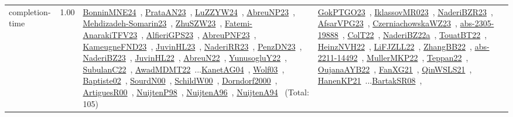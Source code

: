 {\begin{longtable}{p{3cm}r>{\raggedright\arraybackslash}p{6cm}>{\raggedright\arraybackslash}p{6cm}>{\raggedright\arraybackslash}p{8cm}}
\index{completion-time}\index{Concepts!completion-time}completion-time &  1.00 & \href{../works/BonninMNE24.pdf}{BonninMNE24}~\cite{BonninMNE24}, \href{../works/PrataAN23.pdf}{PrataAN23}~\cite{PrataAN23}, \href{../works/LuZZYW24.pdf}{LuZZYW24}~\cite{LuZZYW24}, \href{../works/AbreuNP23.pdf}{AbreuNP23}~\cite{AbreuNP23}, \href{../works/Mehdizadeh-Somarin23.pdf}{Mehdizadeh-Somarin23}~\cite{Mehdizadeh-Somarin23}, \href{../works/ZhuSZW23.pdf}{ZhuSZW23}~\cite{ZhuSZW23}, \href{../works/Fatemi-AnarakiTFV23.pdf}{Fatemi-AnarakiTFV23}~\cite{Fatemi-AnarakiTFV23}, \href{../works/AlfieriGPS23.pdf}{AlfieriGPS23}~\cite{AlfieriGPS23}, \href{../works/AbreuPNF23.pdf}{AbreuPNF23}~\cite{AbreuPNF23}, \href{../works/KameugneFND23.pdf}{KameugneFND23}~\cite{KameugneFND23}, \href{../works/JuvinHL23.pdf}{JuvinHL23}~\cite{JuvinHL23}, \href{../works/NaderiRR23.pdf}{NaderiRR23}~\cite{NaderiRR23}, \href{../works/PenzDN23.pdf}{PenzDN23}~\cite{PenzDN23}, \href{../works/NaderiBZ23.pdf}{NaderiBZ23}~\cite{NaderiBZ23}, \href{../works/JuvinHL22.pdf}{JuvinHL22}~\cite{JuvinHL22}, \href{../works/AbreuN22.pdf}{AbreuN22}~\cite{AbreuN22}, \href{../works/YunusogluY22.pdf}{YunusogluY22}~\cite{YunusogluY22}, \href{../works/SubulanC22.pdf}{SubulanC22}~\cite{SubulanC22}, \href{../works/AwadMDMT22.pdf}{AwadMDMT22}~\cite{AwadMDMT22}...\href{../works/KanetAG04.pdf}{KanetAG04}~\cite{KanetAG04}, \href{../works/Wolf03.pdf}{Wolf03}~\cite{Wolf03}, \href{../works/Baptiste02.pdf}{Baptiste02}~\cite{Baptiste02}, \href{../works/SourdN00.pdf}{SourdN00}~\cite{SourdN00}, \href{../works/SchildW00.pdf}{SchildW00}~\cite{SchildW00}, \href{../works/Dorndorf2000.pdf}{Dorndorf2000}~\cite{Dorndorf2000}, \href{../works/ArtiguesR00.pdf}{ArtiguesR00}~\cite{ArtiguesR00}, \href{../works/NuijtenP98.pdf}{NuijtenP98}~\cite{NuijtenP98}, \href{../works/NuijtenA96.pdf}{NuijtenA96}~\cite{NuijtenA96}, \href{../works/NuijtenA94.pdf}{NuijtenA94}~\cite{NuijtenA94} (Total: 105) & \href{../works/GokPTGO23.pdf}{GokPTGO23}~\cite{GokPTGO23}, \href{../works/IklassovMR023.pdf}{IklassovMR023}~\cite{IklassovMR023}, \href{../works/NaderiBZR23.pdf}{NaderiBZR23}~\cite{NaderiBZR23}, \href{../works/AfsarVPG23.pdf}{AfsarVPG23}~\cite{AfsarVPG23}, \href{../works/CzerniachowskaWZ23.pdf}{CzerniachowskaWZ23}~\cite{CzerniachowskaWZ23}, \href{../works/abs-2305-19888.pdf}{abs-2305-19888}~\cite{abs-2305-19888}, \href{../works/ColT22.pdf}{ColT22}~\cite{ColT22}, \href{../works/NaderiBZ22a.pdf}{NaderiBZ22a}~\cite{NaderiBZ22a}, \href{../works/TouatBT22.pdf}{TouatBT22}~\cite{TouatBT22}, \href{../works/HeinzNVH22.pdf}{HeinzNVH22}~\cite{HeinzNVH22}, \href{../works/LiFJZLL22.pdf}{LiFJZLL22}~\cite{LiFJZLL22}, \href{../works/ZhangBB22.pdf}{ZhangBB22}~\cite{ZhangBB22}, \href{../works/abs-2211-14492.pdf}{abs-2211-14492}~\cite{abs-2211-14492}, \href{../works/MullerMKP22.pdf}{MullerMKP22}~\cite{MullerMKP22}, \href{../works/Teppan22.pdf}{Teppan22}~\cite{Teppan22}, \href{../works/OujanaAYB22.pdf}{OujanaAYB22}~\cite{OujanaAYB22}, \href{../works/FanXG21.pdf}{FanXG21}~\cite{FanXG21}, \href{../works/QinWSLS21.pdf}{QinWSLS21}~\cite{QinWSLS21}, \href{../works/HanenKP21.pdf}{HanenKP21}~\cite{HanenKP21}...\href{../works/BartakSR08.pdf}{BartakSR08}~\cite{BartakSR08}, 
\end{longtable}}
